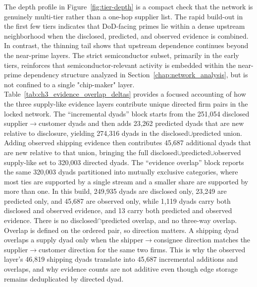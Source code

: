 The depth profile in Figure~\ref{fig:tier-depth} is a compact check that the network is genuinely multi-tier rather than a one-hop supplier list. The rapid build-out in the first few tiers indicates that DoD-facing primes lie within a dense upstream neighborhood when the disclosed, predicted, and observed evidence is combined. In contrast, the thinning tail shows that upstream dependence continues beyond the near-prime layers. The strict semiconductor subset, primarily in the early tiers, reinforces that semiconductor-relevant activity is embedded within the near-prime dependency structure analyzed in Section~\ref{chap:network_analysis}, but is not confined to a single "chip-maker" layer.
Table~\ref{tab:ch3_evidence_overlap_deltas} provides a focused accounting of how the three supply-like evidence layers contribute unique directed firm pairs in the locked network. The ``incremental dyads'' block starts from the 251{,}054 disclosed supplier$\rightarrow$customer dyads and then adds 23{,}262 predicted dyads that are new relative to disclosure, yielding 274{,}316 dyads in the disclosed$\cup$predicted union. Adding observed shipping evidence then contributes 45{,}687 additional dyads that are new relative to that union, bringing the full disclosed$\cup$predicted$\cup$observed supply-like set to 320{,}003 directed dyads. The ``evidence overlap'' block reports the same 320{,}003 dyads partitioned into mutually exclusive categories, where most ties are supported by a single stream and a smaller share are supported by more than one. In this build, 249{,}935 dyads are disclosed only, 23{,}249 are predicted only, and 45{,}687 are observed only, while 1{,}119 dyads carry both disclosed and observed evidence, and 13 carry both predicted and observed evidence. There is no disclosed$\cap$predicted overlap, and no three-way overlap. Overlap is defined on the ordered pair, so direction matters. A shipping dyad overlaps a supply dyad only when the shipper$\rightarrow$consignee direction matches the supplier$\rightarrow$customer direction for the same two firms. This is why the observed layer's 46{,}819 shipping dyads translate into 45{,}687 incremental additions and \ShippingOverlap overlaps, and why evidence counts are not additive even though edge storage remains deduplicated by directed dyad.

